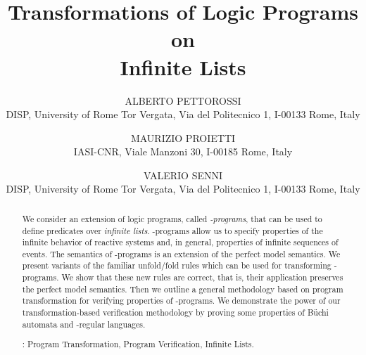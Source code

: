 \documentclass[english]{tlp}
\begin{document}
\thispagestyle{empty}

\long{}


\title[Transformations of Logic Programs on Infinite
Lists] {Transformations of Logic Programs on\\ Infinite Lists}

\author[A. Pettorossi, M. Proietti, and V. Senni]
{ALBERTO PETTOROSSI\\
DISP, University of Rome Tor Vergata,
Via del Politecnico 1, I-00133 Rome, Italy\\
 \and
MAURIZIO PROIETTI\\
IASI-CNR, Viale Manzoni 30, I-00185 Rome, Italy\\
 \and
VALERIO SENNI\\
DISP, University of Rome Tor Vergata,
Via del Politecnico 1, I-00133 Rome, Italy\\
 }

\pagerange{\pageref{firstpage}--\pageref{lastpage}}
  \setcounter{page}{1}

\maketitle

\label{firstpage}

\maketitle
\begin{abstract}
We consider an extension of logic
programs, called {\em -programs}, that can be used to define predicates
over {\em infinite lists}. 
\mbox{-programs} allow us to specify properties of the 
infinite behavior of
reactive systems and, in general, properties of infinite sequences of events. 
The  semantics of \mbox{-programs} is
an extension of the perfect model semantics. 
We present variants of the familiar unfold/fold rules which can be
used for transforming -programs. We show that these new rules are correct, that is,
their application preserves the perfect model semantics. 
Then we outline a general methodology based on program transformation
for verifying properties of -programs.
We demonstrate the power of our transformation-based verification methodology
by proving some properties of B\"uchi automata and \mbox{-regular} languages.

\smallskip

: Program Transformation, Program Verification, Infinite Lists.
\end{abstract}
\end{document}
